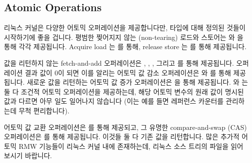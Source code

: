 \fi

\subsection{Atomic Operations}
\label{sec:toolsoftrade:Atomic Operations}

리눅스 커널은 다양한 어토믹 오퍼레이션을 제공합니다만,  타입에
대해 정의된 것들이 시작하기에 좋을 겁니다.
평범한 찢어지지 않는 (non-tearing) 로드와 스토어는  와
 을 통해 각각 제공됩니다.
Acquire load 는  를 통해, release store 는
 를 통해 제공됩니다.

값을 리턴하지 않는 fetch-and-add 오퍼레이션은 ,
, , 그리고  를 통해
제공됩니다.
오퍼레이션 결과 값이 0이 되면 이를 알리는 어토믹 값 감소 오퍼레이션은
 와  를 통해
제공됩니다.
새로운 값을 리턴하는 어토믹 값 증가 오퍼레이션은 
을 통해 제공됩니다.
 와  는 둘 다 조건적
어토믹 오퍼레이션을 제공하는데, 해당 어토믹 변수의 원래 값이 명시된 값과 다르면
아무 일도 일어나지 않습니다 (이는 예를 들면 레퍼런스 카운터를 관리하는데 무척
편리합니다).

어토믹 값 교환 오퍼레이션은  를 통해 제공되고, 그 유명한
compare-and-swap (CAS) 오퍼레이션은  를 통해 제공됩니다.
이것들 둘 다 기존 값을 리턴합니다.
많은 추가적 어토믹 RMW 기능들이 리눅스 커널 내에 존재하는데, 리눅스 소스 트리의
 파일을 읽어보시기 바랍니다.

